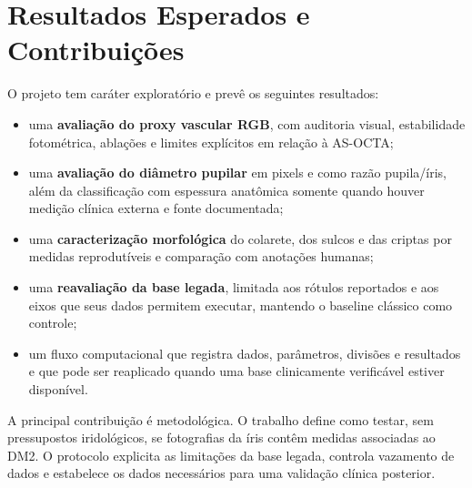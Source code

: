 \documentclass[12pt,a4paper]{article}
\begin{document}
\section{Resultados Esperados e Contribuições}

O projeto tem caráter exploratório e prevê os seguintes resultados:
\begin{itemize}
    \item uma \textbf{avaliação do proxy vascular RGB}, com auditoria visual, estabilidade
    fotométrica, ablações e limites explícitos em relação à AS-OCTA;
    \item uma \textbf{avaliação do diâmetro pupilar} em pixels e como razão pupila/íris, além da
    classificação com espessura anatômica somente quando houver medição clínica externa e fonte
    documentada;
    \item uma \textbf{caracterização morfológica} do colarete, dos sulcos e das criptas por medidas
    reprodutíveis e comparação com anotações humanas;
    \item uma \textbf{reavaliação da base legada}, limitada aos rótulos reportados e aos eixos que
    seus dados permitem executar, mantendo o baseline clássico como controle;
    \item um fluxo computacional que registra dados, parâmetros, divisões e resultados e que pode ser
    reaplicado quando uma base clinicamente verificável estiver disponível.
\end{itemize}

A principal contribuição é metodológica. O trabalho define como testar, sem pressupostos
iridológicos, se fotografias da íris contêm medidas associadas ao DM2. O protocolo explicita as
limitações da base legada, controla vazamento de dados e estabelece os dados necessários para uma
validação clínica posterior.
\end{document}
